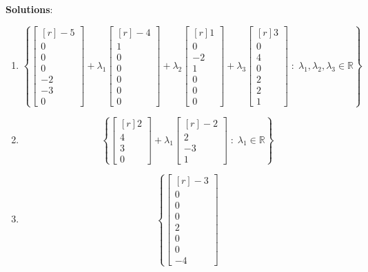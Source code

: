 \documentclass[12pt]{article}
\begin{document}
\clearpage
\textbf{Solutions}:
\begin{enumerate}
\item\[\left\{\begin{bmatrix*}[r]-5\\0\\0\\0\\-2\\-3\\0\end{bmatrix*}
+\lambda_{1}\begin{bmatrix*}[r]-4\\1\\0\\0\\0\\0\\0\end{bmatrix*}
+\lambda_{2}\begin{bmatrix*}[r]1\\0\\-2\\1\\0\\0\\0\end{bmatrix*}
+\lambda_{3}\begin{bmatrix*}[r]3\\0\\4\\0\\2\\2\\1\end{bmatrix*}
\;:\;\lambda_{1},\lambda_{2},\lambda_{3}\in\mathbb{R}\right\}
\]
\item\[\left\{\begin{bmatrix*}[r]2\\4\\3\\0\end{bmatrix*}
+\lambda_{1}\begin{bmatrix*}[r]-2\\2\\-3\\1\end{bmatrix*}
\;:\;\lambda_{1}\in\mathbb{R}\right\}
\]
\item\[\left\{\begin{bmatrix*}[r]-3\\0\\0\\0\\2\\0\\0\\-4\end{bmatrix*}
\]
\end{enumerate}
\end{document}
